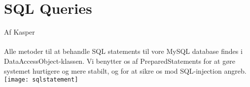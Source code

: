 \section{SQL Queries}
Af Kasper\\\\
Alle metoder til at behandle SQL statements til vore MySQL database findes i DataAccessObject-klassen. Vi benytter os af PreparedStatements for at gøre systemet hurtigere og mere stabilt, og for at sikre os mod SQL-injection angreb.
\texttt{[image: sqlstatement]}
